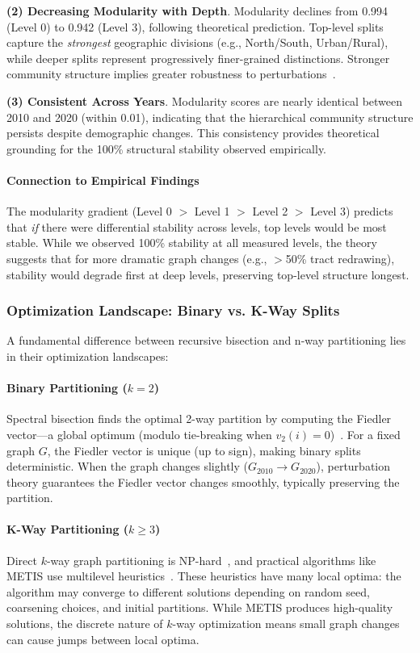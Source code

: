 \textbf{(2) Decreasing Modularity with Depth}. Modularity declines from 0.994 (Level 0) to 0.942 (Level 3), following theoretical prediction. Top-level splits capture the \textit{strongest} geographic divisions (e.g., North/South, Urban/Rural), while deeper splits represent progressively finer-grained distinctions. Stronger community structure implies greater robustness to perturbations~\citep{fortunato2010community}.

\textbf{(3) Consistent Across Years}. Modularity scores are nearly identical between 2010 and 2020 (within 0.01), indicating that the hierarchical community structure persists despite demographic changes. This consistency provides theoretical grounding for the 100\% structural stability observed empirically.

\paragraph{Connection to Empirical Findings} The modularity gradient (Level 0 $>$ Level 1 $>$ Level 2 $>$ Level 3) predicts that \textit{if} there were differential stability across levels, top levels would be most stable. While we observed 100\% stability at all measured levels, the theory suggests that for more dramatic graph changes (e.g., $>$50\% tract redrawing), stability would degrade first at deep levels, preserving top-level structure longest.

\subsubsection{Optimization Landscape: Binary vs. K-Way Splits}

A fundamental difference between recursive bisection and n-way partitioning lies in their optimization landscapes:

\paragraph{Binary Partitioning ($k=2$)} Spectral bisection finds the optimal 2-way partition by computing the Fiedler vector---a global optimum (modulo tie-breaking when $v_2(i) = 0$)~\citep{fiedler1973algebraic}. For a fixed graph $G$, the Fiedler vector is unique (up to sign), making binary splits deterministic. When the graph changes slightly ($G_{2010} \rightarrow G_{2020}$), perturbation theory guarantees the Fiedler vector changes smoothly, typically preserving the partition.

\paragraph{K-Way Partitioning ($k \geq 3$)} Direct $k$-way graph partitioning is NP-hard~\citep{garey1979computers}, and practical algorithms like METIS use multilevel heuristics~\citep{karypis1998fast}. These heuristics have many local optima: the algorithm may converge to different solutions depending on random seed, coarsening choices, and initial partitions. While METIS produces high-quality solutions, the discrete nature of $k$-way optimization means small graph changes can cause jumps between local optima.

